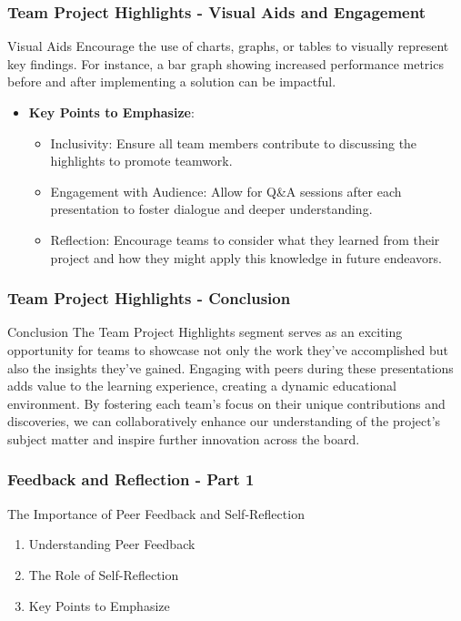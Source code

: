 \documentclass{beamer}
\begin{document}
\begin{frame}[fragile]
    \frametitle{Team Project Highlights - Visual Aids and Engagement}
    \begin{block}{Visual Aids}
        Encourage the use of charts, graphs, or tables to visually represent key findings. For instance, a bar graph showing increased performance metrics before and after implementing a solution can be impactful.
    \end{block}

    \begin{itemize}
        \item \textbf{Key Points to Emphasize}:
            \begin{itemize}
                \item Inclusivity: Ensure all team members contribute to discussing the highlights to promote teamwork.
                \item Engagement with Audience: Allow for Q\&A sessions after each presentation to foster dialogue and deeper understanding.
                \item Reflection: Encourage teams to consider what they learned from their project and how they might apply this knowledge in future endeavors.
            \end{itemize}
    \end{itemize}
\end{frame}

\begin{frame}[fragile]
    \frametitle{Team Project Highlights - Conclusion}
    \begin{block}{Conclusion}
        The Team Project Highlights segment serves as an exciting opportunity for teams to showcase not only the work they've accomplished but also the insights they've gained. Engaging with peers during these presentations adds value to the learning experience, creating a dynamic educational environment. By fostering each team's focus on their unique contributions and discoveries, we can collaboratively enhance our understanding of the project's subject matter and inspire further innovation across the board.
    \end{block}
\end{frame}

\begin{frame}[fragile]
    \frametitle{Feedback and Reflection - Part 1}
    \begin{block}{The Importance of Peer Feedback and Self-Reflection}
        \begin{enumerate}
            \item Understanding Peer Feedback
            \item The Role of Self-Reflection
            \item Key Points to Emphasize
        \end{enumerate}
    \end{block}
\end{frame}
\end{document}
